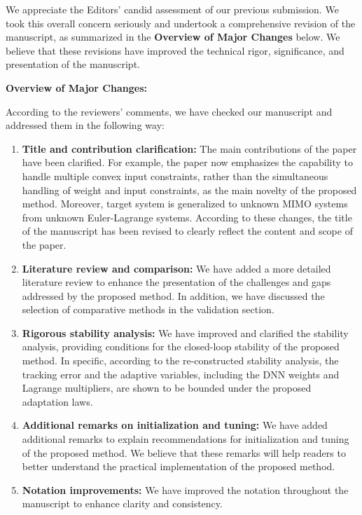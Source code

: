 \documentclass[12pt,english]{reviewresponse}
\begin{document}
\begin{revresponse}[]
  We appreciate the Editors' candid assessment of our previous submission. 
  We took this overall concern seriously and undertook a comprehensive revision of the manuscript, as summarized in the \textbf{Overview of Major Changes} below.
  We believe that these revisions have improved the technical rigor, significance, and presentation of the manuscript.

  \vspace{1.2em}

  \textbf{Overview of Major Changes:}

  According to the reviewers' comments, we have checked our manuscript and addressed them in the following way:
  \begin{enumerate}

    \item \textbf{Title and contribution clarification:} 
      The main contributions of the paper have been clarified.
      For example, the paper now emphasizes the capability to handle multiple convex input constraints, rather than the simultaneous handling of weight and input constraints, as the main novelty of the proposed method.
      Moreover, target system is generalized to unknown MIMO systems from unknown Euler-Lagrange systems.
      According to these changes, the title of the manuscript has been revised to clearly reflect the content and scope of the paper.

    \item \textbf{Literature review and comparison:} 
      We have added a more detailed literature review to enhance the presentation of the challenges and gaps addressed by the proposed method.
      In addition, we have discussed the selection of comparative methods in the validation section.

    \item \textbf{Rigorous stability analysis:} 
      We have improved and clarified the stability analysis, providing conditions for the closed-loop stability of the proposed method.
      In specific, according to the re-constructed stability analysis, the tracking error and the adaptive variables, including the DNN weights and Lagrange multipliers, are shown to be bounded under the proposed adaptation laws.

    \item \textbf{Additional remarks on initialization and tuning:} 
      We have added additional remarks to explain recommendations for initialization and tuning of the proposed method.
      We believe that these remarks will help readers to better understand the practical implementation of the proposed method.

    \item \textbf{Notation improvements:} 
      We have improved the notation throughout the manuscript to enhance clarity and consistency.

  \end{enumerate}

\end{revresponse}
\end{document}
